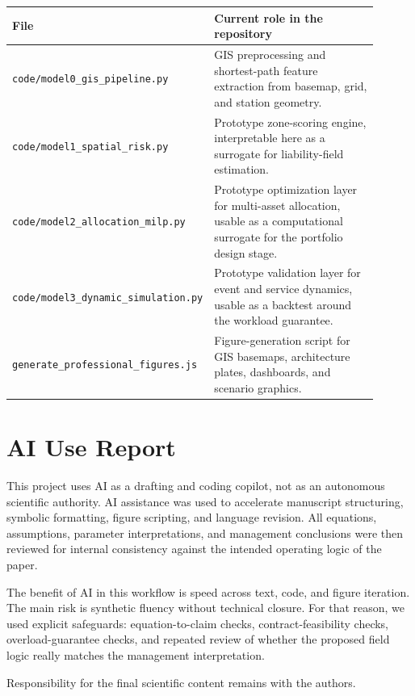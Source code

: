 \begin{longtable}{p{0.30\linewidth}p{0.60\linewidth}}
\toprule
File & Current role in the repository \\
\midrule
\texttt{code/model0\_gis\_pipeline.py} & GIS preprocessing and shortest-path feature extraction from basemap, grid, and station geometry. \\
\texttt{code/model1\_spatial\_risk.py} & Prototype zone-scoring engine, interpretable here as a surrogate for liability-field estimation. \\
\texttt{code/model2\_allocation\_milp.py} & Prototype optimization layer for multi-asset allocation, usable as a computational surrogate for the portfolio design stage. \\
\texttt{code/model3\_dynamic\_simulation.py} & Prototype validation layer for event and service dynamics, usable as a backtest around the workload guarantee. \\
\texttt{generate\_professional\_figures.js} & Figure-generation script for GIS basemaps, architecture plates, dashboards, and scenario graphics. \\
\bottomrule
\end{longtable}

\section*{AI Use Report}
This project uses AI as a drafting and coding copilot, not as an autonomous scientific authority. AI assistance was used to accelerate manuscript structuring, symbolic formatting, figure scripting, and language revision. All equations, assumptions, parameter interpretations, and management conclusions were then reviewed for internal consistency against the intended operating logic of the paper.

The benefit of AI in this workflow is speed across text, code, and figure iteration. The main risk is synthetic fluency without technical closure. For that reason, we used explicit safeguards: equation-to-claim checks, contract-feasibility checks, overload-guarantee checks, and repeated review of whether the proposed field logic really matches the management interpretation.

Responsibility for the final scientific content remains with the authors.

